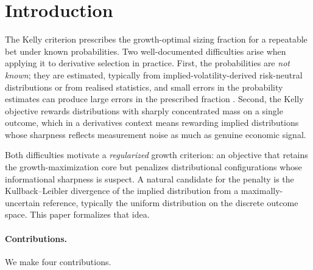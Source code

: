 \documentclass[11pt]{article}
\theoremstyle{definition}
\theoremstyle{remark}
\newcommand{\GROUND}{\Gamma_{\mathrm{i}}}
\begin{document}
\begin{abstract}
equivalence $\arg\max_i \GROUND(p_i, x_i, k) = \arg\max_i J_k(p_i,
x_i)$ holds exactly by construction via the identity $\GROUND = \exp(J_k)$,
so the multiplicative and additive forms produce identical rankings;
(ii) the limiting cases of $J_k$ recover pure Kelly
growth selection ($k \to 0$) and maximum-entropy selection ($k \to
\infty$); (iii) the induced indifference-price functional reduces to
the minimum-entropy martingale measure expectation as $k \to 0$,
embedding $\GROUND$ in the incomplete-markets pricing-kernel
literature \citep{frittelli2000,follmer2002}. The criterion is
empirically validated in companion work on six years of S\&P 100
weekly credit spreads \citep{mercurio2026empirical}, where it
produces a Sharpe ratio of $1.63$, Calmar of $4.03$, and max drawdown
of $-7.2\%$ on a five-year in-sample window, and Sharpe $2.99$, Calmar
$12.44$, max drawdown $-4.7\%$ on a strict 70-week holdout.
\end{abstract}


\section{Introduction}\label{sec:intro}

The Kelly criterion \citep{kelly1956,maclean2011} prescribes the
growth-optimal sizing fraction for a repeatable bet under known
probabilities. Two well-documented difficulties arise when applying it
to derivative selection in practice. First, the probabilities are
\emph{not known}; they are estimated, typically from
implied-volatility-derived risk-neutral distributions
\citep{breeden1978} or from realised statistics, and small errors in
the probability estimates can produce large errors in the prescribed
fraction \citep{maclean2011}. Second, the Kelly objective rewards
distributions with sharply concentrated mass on a single outcome, which
in a derivatives context means rewarding implied distributions whose
sharpness reflects measurement noise as much as genuine economic
signal.

Both difficulties motivate a \emph{regularized} growth criterion: an
objective that retains the growth-maximization core but penalizes
distributional configurations whose informational sharpness is suspect.
A natural candidate for the penalty is the Kullback--Leibler divergence
of the implied distribution from a maximally-uncertain reference,
typically the uniform distribution on the discrete outcome space. This
paper formalizes that idea.

\paragraph{Contributions.}
We make four contributions.
\end{document}
